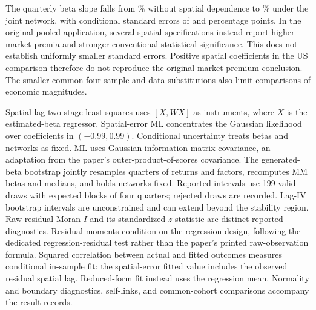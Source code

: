 \documentclass[11pt]{article}
\begin{document}
\begin{table}[htbp]
  \centering\small
  
  \caption{Common-four characteristic-history replication,
    \ReplicationFourFirms{} firms. Beta slopes
    are percentages, with conditional standard errors in parentheses.
    Spatial-error ML uses zero self-links and unit-bandwidth
    exponential weights.
    Likelihood gains are relative to OLS\@; AIC counts the spatial parameter.
  The joint characteristic network is an extension.}\label{tab:replication}
\end{table}

The quarterly beta slope falls from \ReplicationOlsSlope\% without spatial
dependence to \ReplicationJointSlope\% under the joint network, with conditional
standard errors of \ReplicationOlsSe{} and \ReplicationJointSe{} percentage
points. In the original pooled application, several spatial specifications
instead report higher market premia and stronger conventional statistical
significance. This does not establish uniformly smaller standard errors.
Positive spatial
coefficients in the US comparison therefore do not reproduce the original
market-premium conclusion. The smaller common-four sample and data substitutions
also limit comparisons of economic magnitudes.

Spatial-lag two-stage least squares uses $[X,WX]$ as instruments, where $X$ is
the estimated-beta regressor. Spatial-error ML concentrates the Gaussian
likelihood over coefficients in $(-0.99,0.99)$. Conditional uncertainty treats
betas and networks as fixed. ML uses Gaussian information-matrix covariance,
an adaptation from the paper's outer-product-of-scores covariance.
The generated-beta
bootstrap jointly resamples quarters of returns and factors, recomputes MM
betas and medians, and holds networks fixed. Reported intervals use 199 valid
draws with expected blocks of four quarters; rejected draws are recorded.
Lag-IV bootstrap intervals are unconstrained and can extend beyond the stability
region. Raw residual Moran $I$ and its standardized $z$ statistic are distinct
reported diagnostics. Residual moments condition on the regression design,
following the dedicated regression-residual test rather than the paper's
printed raw-observation formula. Squared correlation between actual and fitted
outcomes measures
conditional in-sample fit: the spatial-error fitted value includes the observed
residual spatial lag. Reduced-form fit instead uses the regression mean.
Normality and boundary diagnostics, self-links, and common-cohort comparisons
accompany the result records.
\end{document}
